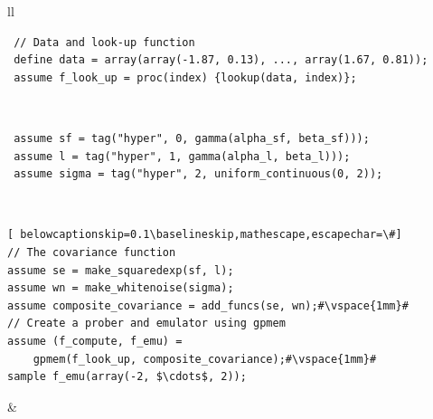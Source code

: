 \begin{tabular}{ll} \hline
{}
  \begin{minipage}{4cm}
 \footnotesize\begin{lstlisting}
 // Data and look-up function
 define data = array(array(-1.87, 0.13), ..., array(1.67, 0.81));
 assume f_look_up = proc(index) {lookup(data, index)};
\end{lstlisting}
\end{minipage}\\
\hline
{}
  \begin{minipage}{4cm}
 \footnotesize\begin{lstlisting}
 assume sf = tag("hyper", 0, gamma(alpha_sf, beta_sf)));
 assume l = tag("hyper", 1, gamma(alpha_l, beta_l)));
 assume sigma = tag("hyper", 2, uniform_continuous(0, 2));
\end{lstlisting}
\end{minipage}
  \\
\hline
\footnotesize\begin{lstlisting}[ belowcaptionskip=0.1\baselineskip,mathescape,escapechar=\#]
// The covariance function
assume se = make_squaredexp(sf, l);
assume wn = make_whitenoise(sigma);
assume composite_covariance = add_funcs(se, wn);#\vspace{1mm}#
// Create a prober and emulator using gpmem
assume (f_compute, f_emu) =
    gpmem(f_look_up, composite_covariance);#\vspace{1mm}#
sample f_emu(array(-2, $\cdots$, 2));
\end{lstlisting}
 &    \\ \hline


\end{tabular}
